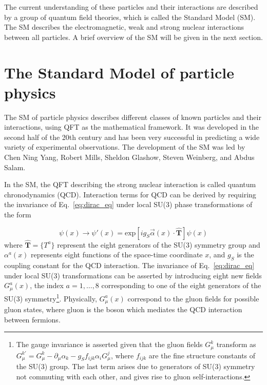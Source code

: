 The current understanding of these particles and their interactions are described by a group of quantum
field theories, which is called the Standard Model (SM). The SM describes the electromagnetic, weak and 
strong nuclear interactions between all particles. A brief overview of the SM will be given in the
next section.

\section{The Standard Model of particle physics}

The SM of particle physics describes different classes of known particles and their interactions, 
using QFT as the mathematical framework. It was developed in the second half of the 20th century
and has been very successful in predicting a wide variety of experimental observations. The development of the SM
was led by Chen Ning Yang, Robert Mills, Sheldon Glashow, Steven Weinberg, and Abdus Salam.

In the SM, the QFT describing the strong nuclear interaction is called quantum chronodynamics (QCD). 
Interaction terms for QCD can be derived by requiring the invariance of Eq.~\ref{eq:dirac_eq} under 
local SU(3) phase transformations of the form

\begin{equation}
    \psi(x) \rightarrow \psi'(x) = \text{exp} \left[ i g_S \vec{\alpha}(x) \cdot \hat{\mathbf{T}}  \right]  \psi(x)
\end{equation}
where $\hat{\mathbf{T}} = \{ T^a \}$ represent the eight generators of the SU(3) symmetry group and $\alpha^a(x)$ 
represents eight functions
of the space-time coordinate $x$, and $g_{S}$ is the coupling constant for the QCD interaction.
The invariance of Eq.~\ref{eq:dirac_eq} under local SU(3) transformations can be asserted by introducing eight new fields
$G_{\mu}^{a}(x)$, the index $a = 1, \dots, 8$ corresponding to one of the eight generators of the SU(3) 
symmetry\footnote{The gauge invariance is asserted given that the gluon fields $G_{\mu}^{k}$ transform as
$G_{\mu}^{k'} = G_{\mu}^{k} - \partial_{\mu}\alpha_{k} - g_{S}f_{ijk}\alpha_{i}G_{\mu}^{j}$, where $f_{ijk}$ are
the fine structure constants of the SU(3) group. The last term arises due to generators of SU(3) symmetry not commuting
with each other, and gives rise to gluon self-interactions.}. Physically,
$G_{\mu}^{a}(x)$ correspond to the gluon fields for possible gluon states, where gluon is the boson which
mediates the QCD interaction between 
fermions.

